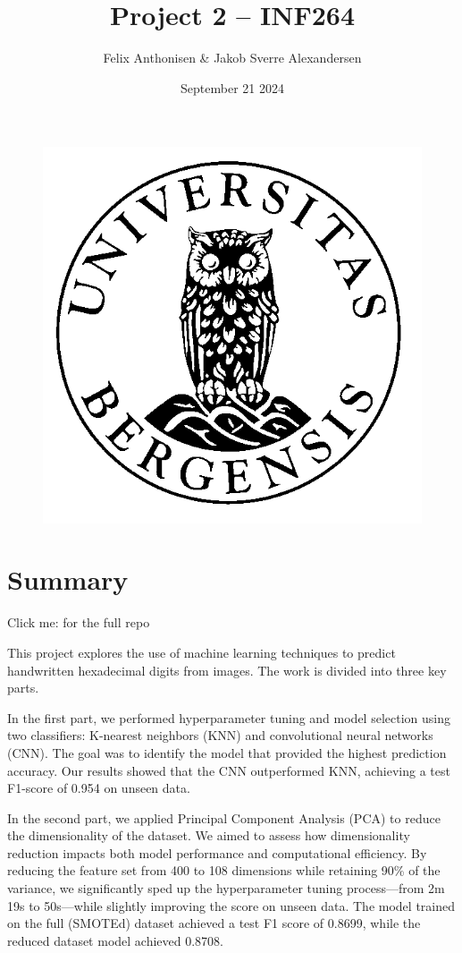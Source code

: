 \documentclass{article}
\title{Project 2 – INF264}
\author{Felix Anthonisen & Jakob Sverre Alexandersen}
\date{September 21 2024}
\begin{document}
\maketitle
\thispagestyle{empty}

\hfill \break
\hfill \break
\begin{figure}[H]
    \centering
    \includegraphics[width=0.5\linewidth]{ugle.png}
\end{figure}
\newpage
\maketitle

\section{Summary}

Click me: \href{https://github.com/FelixAnthonisen/INF264-project2}{} for the full repo

\hrulefill

This project explores the use of machine learning techniques to predict handwritten hexadecimal digits from images. The work is divided into three key parts.

In the first part, we performed hyperparameter tuning and model selection using two classifiers: K-nearest neighbors (KNN) and convolutional neural networks (CNN). The goal was to identify the model that provided the highest prediction accuracy. Our results showed that the CNN outperformed KNN, achieving a test F1-score of 0.954 on unseen data.

In the second part, we applied Principal Component Analysis (PCA) to reduce the dimensionality of the dataset. We aimed to assess how dimensionality reduction impacts both model performance and computational efficiency. By reducing the feature set from 400 to 108 dimensions while retaining 90\% of the variance, we significantly sped up the hyperparameter tuning process—from 2m 19s to  50s—while slightly improving the score on unseen data. The model trained on the full (SMOTEd) dataset achieved a test F1 score of 0.8699, while the reduced dataset model achieved 0.8708.
\end{document}

